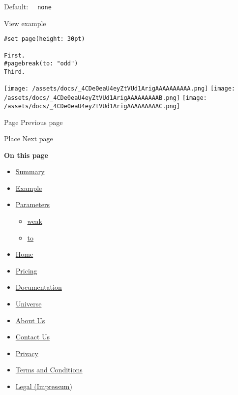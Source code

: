Default: \texttt{\ }{\texttt{\ none\ }}\texttt{\ }


View example

\begin{verbatim}
#set page(height: 30pt)

First.
#pagebreak(to: "odd")
Third.
\end{verbatim}

\texttt{[image: /assets/docs/\_4CDe0eaU4eyZtVUd1ArigAAAAAAAAAA.png]}
\texttt{[image: /assets/docs/\_4CDe0eaU4eyZtVUd1ArigAAAAAAAAAB.png]}
\texttt{[image: /assets/docs/\_4CDe0eaU4eyZtVUd1ArigAAAAAAAAAC.png]}

\href{/docs/reference/layout/page/}{\pandocbounded{}}

{ Page } { Previous page }

\href{/docs/reference/layout/place/}{\pandocbounded{}}

{ Place } { Next page }

\textbf{On this page}

\begin{itemize}
\tightlist
\item
  \hyperref[summary]{Summary}
\item
  \hyperref[example]{Example}
\item
  \hyperref[parameters]{Parameters}

  \begin{itemize}
  \tightlist
  \item
    \hyperref[parameters-weak]{weak}
  \item
    \hyperref[parameters-to]{to}
  \end{itemize}
\end{itemize}

\begin{itemize}
\tightlist
\item
  \href{/}{Home}
\item
  \href{/pricing/}{Pricing}
\item
  \href{/docs/}{Documentation}
\item
  \href{/universe/}{Universe}
\item
  \href{/about/}{About Us}
\item
  \href{/contact/}{Contact Us}
\item
  \href{/privacy/}{Privacy}
\item
  \href{https://typst.app/terms}{Terms and Conditions}
\item
  \href{/legal/}{Legal (Impressum)}
\end{itemize}

